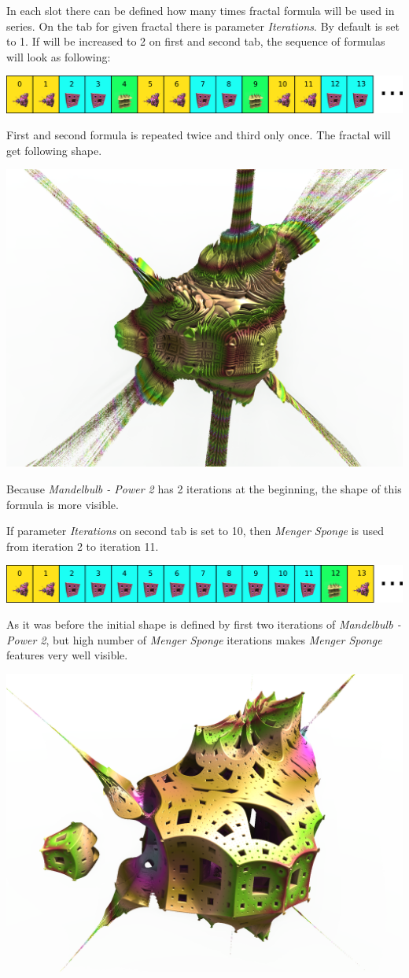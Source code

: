 In each slot there can be defined how many times fractal formula will be used in series. 
On the tab for given fractal there is parameter \emph{Iterations}. By default is set to 1. If will be increased to 2 on first and second tab, the sequence of formulas will look as following:

\includegraphics[width=\linewidth]{img/manual/media/iteration_loop_hybrid_sequence_2.png}

First and second formula is repeated twice and third only once. 
The fractal will get following shape.

\includegraphics[width=0.7\linewidth]{img/manual/media/hybrid_sequence_example_2.png}

Because \emph{Mandelbulb - Power 2} has 2 iterations at the beginning, the shape of this formula is more visible.

If parameter \emph{Iterations} on second tab is set to 10, then \emph{Menger Sponge} is used from iteration 2 to iteration 11.

\includegraphics[width=\linewidth]{img/manual/media/iteration_loop_hybrid_sequence_3.png}

As it was before the initial shape is defined by first two iterations of \emph{Mandelbulb - Power 2}, but high number of \emph{Menger Sponge} iterations makes \emph{Menger Sponge} features very well visible.

\includegraphics[width=0.7\linewidth]{img/manual/media/hybrid_sequence_example_3.png}

